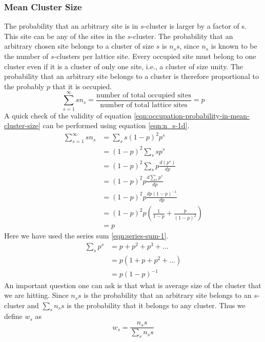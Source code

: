 		\subsubsection{Mean Cluster Size}
		The probability that an arbitrary site is in $s$-cluster is larger by a factor of s. This site can be any of the sites in the $s$-cluster. The probability that an arbitrary chosen site belongs to a cluster of size $s$ is $n_s s$, since $n_s$ is known to be the number of $s$-clusters per lattice site. Every occupied site must belong to one cluster even if it is a cluster of only one site, i.e., a cluster of size unity.  The probability that an arbitrary site belongs to a cluster is therefore proportional to the probably
		$p$ that it is occupied.
		\begin{equation}
			\sum_{s=1}^{\infty} s n_s = \frac{\text{number of total occupied sites}}{\text{number of total lattice sites}} = p
			\label{eqn:occupation-probability-in-mean-cluster-size}
		\end{equation}
		A quick check of the validity of equation \ref{eqn:occupation-probability-in-mean-cluster-size} can be performed using equation \ref{eqn:n_s-1d}.
		\begin{align}
			\sum_{s=1}^{\infty}	s n_s \nonumber
			&=  \sum_{s} s (1-p)^2 p^s \nonumber \\
			&= (1-p)^2 \sum_{s} s p^s  \nonumber \\
			&= (1-p)^2 \sum_{s} p \frac{d(p^s)}{dp} \nonumber \\
			&= (1-p)^2 p \frac{d \sum_{s} p^s}{dp} \nonumber \\
			&= (1-p)^2 p \frac{d p(1-p)^{-1}}{dp} \nonumber \\
			&= (1-p)^2 p \left(\frac{1}{1-p} + \frac{p}{(1-p)^2}\right) \nonumber \\
			&= p 
		\end{align}
		Here we have used the series sum \ref{eqn:series-sum-1}.
		\begin{align}
			\sum_s p^s 
			&= p + p^2 + p^3 + \ldots \nonumber \\
			&= p( 1 + p + p^2 + \ldots) \nonumber \\
			&= p(1-p)^{-1}
			\label{eqn:series-sum-1}
		\end{align}
		An important question one can ask is that what is average size of the cluster that we are hitting. Since $n_s s$ is the probability that an arbitrary site belongs to an $s$-cluster and $\sum_{s} n_s s$ is the probability that it belongs to any cluster. Thus we define $w_s$ as
		\begin{equation}
			w_s = \frac{n_s s}{\sum_{s} n_s s}
			\label{eqn:arbitrary-cluster-exactly-s-sites}
		\end{equation}

